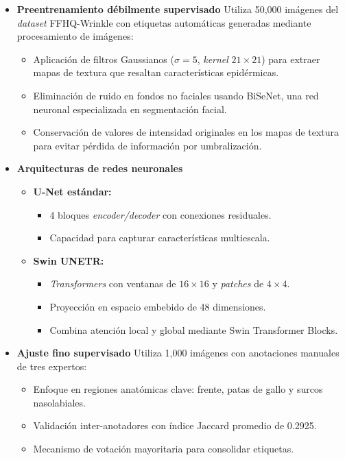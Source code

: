 \begin{itemize}
    \item \textbf{Preentrenamiento débilmente supervisado}
	Utiliza 50,000 imágenes del \textit{dataset} FFHQ-Wrinkle con etiquetas automáticas generadas mediante procesamiento de imágenes:
	\begin{itemize}[label=$\bullet$, leftmargin=1em]
		\item Aplicación de filtros Gaussianos ($\sigma=5$, \textit{kernel} $21 \times 21$) para extraer mapas de textura que resaltan características epidérmicas.
		\item Eliminación de ruido en fondos no faciales usando BiSeNet, una red neuronal especializada en segmentación facial.
		\item Conservación de valores de intensidad originales en los mapas de textura para evitar pérdida de información por umbralización.
	\end{itemize}
	
	
	\item \textbf{Arquitecturas de redes neuronales}
	\begin{itemize}[label=$\bullet$, leftmargin=1em]
		\item \textbf{U-Net estándar:}
		\begin{itemize}[label=$\circ$, leftmargin=1em]
			\item 4 bloques \textit{encoder/decoder} con conexiones residuales.
			\item Capacidad para capturar características multiescala.
		\end{itemize}
		\item \textbf{Swin UNETR:}
		\begin{itemize}[label=$\circ$, leftmargin=1em]
			\item \textit{Transformers} con ventanas de $16 \times 16$ y \textit{patches} de $4 \times 4$.
			\item Proyección en espacio embebido de 48 dimensiones.
			\item Combina atención local y global mediante Swin Transformer Blocks.
		\end{itemize}
	\end{itemize}
	
	
	\item \textbf{Ajuste fino supervisado}
	Utiliza 1,000 imágenes con anotaciones manuales de tres expertos:
	\begin{itemize}[label=$\bullet$, leftmargin=1em]
		\item Enfoque en regiones anatómicas clave: frente, patas de gallo y surcos nasolabiales.
		\item Validación inter-anotadores con índice Jaccard promedio de 0.2925.
		\item Mecanismo de votación mayoritaria para consolidar etiquetas.
	\end{itemize}

\end{itemize}


